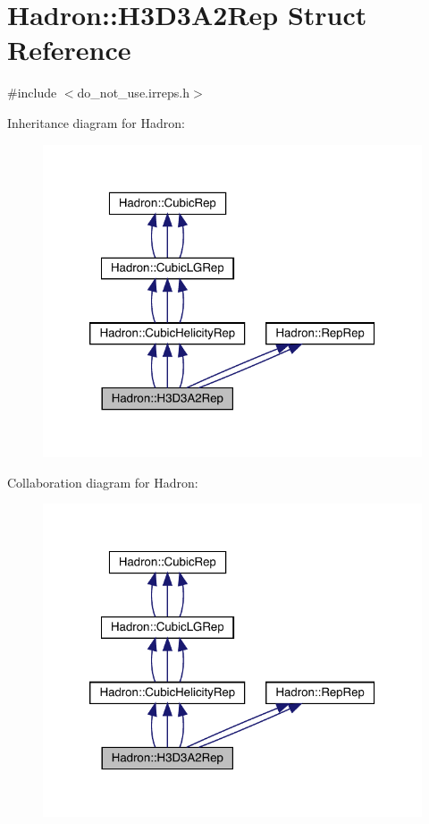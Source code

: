 \hypertarget{structHadron_1_1H3D3A2Rep}{}\section{Hadron\+:\+:H3\+D3\+A2\+Rep Struct Reference}
\label{structHadron_1_1H3D3A2Rep}


{\ttfamily \#include $<$do\+\_\+not\+\_\+use.\+irreps.\+h$>$}



Inheritance diagram for Hadron\+:
\nopagebreak
\begin{figure}[H]
\begin{center}
\leavevmode
\includegraphics[width=320pt]{d9/ddc/structHadron_1_1H3D3A2Rep__inherit__graph}
\end{center}
\end{figure}


Collaboration diagram for Hadron\+:
\nopagebreak
\begin{figure}[H]
\begin{center}
\leavevmode
\includegraphics[width=320pt]{d0/d92/structHadron_1_1H3D3A2Rep__coll__graph}
\end{center}
\end{figure}
